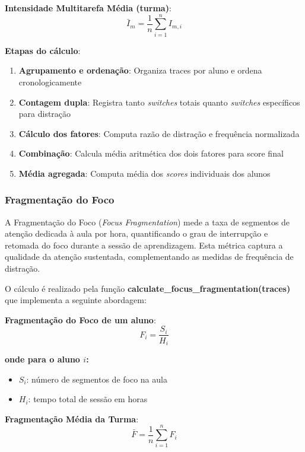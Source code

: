 \textbf{Intensidade Multitarefa Média (turma)}:
\begin{equation}
\bar{I}_m = \frac{1}{n} \sum_{i=1}^{n} I_{m,i}
\end{equation}

\textbf{Etapas do cálculo}:
\begin{enumerate}
    \item \textbf{Agrupamento e ordenação}: Organiza traces por aluno e ordena cronologicamente
    \item \textbf{Contagem dupla}: Registra tanto \textit{switches} totais quanto \textit{switches} específicos para distração
    \item \textbf{Cálculo dos fatores}: Computa razão de distração e frequência normalizada
    \item \textbf{Combinação}: Calcula média aritmética dos dois fatores para score final
    \item \textbf{Média agregada}: Computa média dos \textit{scores} individuais dos alunos
\end{enumerate}

\subsubsection{Fragmentação do Foco}

A Fragmentação do Foco (\textit{Focus Fragmentation}) mede a taxa de segmentos de atenção dedicada à aula por hora, quantificando o grau de interrupção e retomada do foco durante a sessão de aprendizagem. Esta métrica captura a qualidade da atenção sustentada, complementando as medidas de frequência de distração.

O cálculo é realizado pela função \textbf{calculate\_focus\_fragmentation(traces)} que implementa a seguinte abordagem:

\textbf{Fragmentação do Foco de um aluno}:
\begin{equation}
F_i = \frac{S_i}{H_i}
\end{equation}

\textbf{onde para o aluno $i$:}
\begin{itemize}
    \item $S_i$: número de segmentos de foco na aula
    \item $H_i$: tempo total de sessão em horas
\end{itemize}

\textbf{Fragmentação Média da Turma}:
\begin{equation}
\bar{F} = \frac{1}{n} \sum_{i=1}^{n} F_i
\end{equation}

